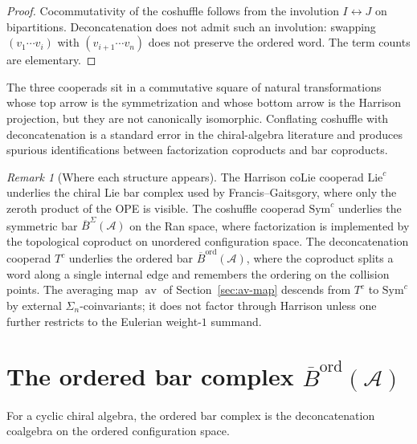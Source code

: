 \documentclass[11pt,reqno]{amsart}
\theoremstyle{definition}
\theoremstyle{remark}
\newtheorem{remark}[theorem]{Remark}
\newcommand{\cA}{\mathcal{A}}
\newcommand{\Sym}{\mathrm{Sym}}
\newcommand{\Lie}{\mathrm{Lie}}
\newcommand{\Barord}{\overline{B}^{\mathrm{ord}}}
\newcommand{\BarSig}{\overline{B}^{\Sigma}}
\newcommand{\av}{\operatorname{av}}
\numberwithin{equation}{section}
\begin{document}
\begin{proof}
Cocommutativity of the coshuffle follows from the involution
$I \leftrightarrow J$ on bipartitions. Deconcatenation does not
admit such an involution: swapping $(v_{1}\cdots v_{i})$ with
$(v_{i+1}\cdots v_{n})$ does not preserve the ordered word. The
term counts are elementary.
\end{proof}

The three cooperads sit in a commutative square of natural
transformations whose top arrow is the symmetrization and whose
bottom arrow is the Harrison projection, but they are not
canonically isomorphic. Conflating coshuffle with deconcatenation
is a standard error in the chiral-algebra literature and produces
spurious identifications between factorization coproducts and
bar coproducts.

\begin{remark}[Where each structure appears]
\label{rem:where-three-appear}
The Harrison coLie cooperad $\Lie^{c}$ underlies the chiral Lie
bar complex used by Francis--Gaitsgory, where only the zeroth
product of the OPE is visible. The coshuffle cooperad $\Sym^{c}$
underlies the symmetric bar $\BarSig(\cA)$ on the Ran space,
where factorization is implemented by the topological
coproduct on unordered configuration space. The deconcatenation
cooperad $T^{c}$ underlies the ordered bar $\Barord(\cA)$, where
the coproduct splits a word along a single internal edge and
remembers the ordering on the collision points. The averaging
map $\av$ of Section~\ref{sec:av-map} descends from $T^{c}$ to
$\Sym^{c}$ by external $\Sigma_{n}$-coinvariants; it does not
factor through Harrison unless one further restricts to the
Eulerian weight-$1$ summand.
\end{remark}

\section{The ordered bar complex \texorpdfstring{$\Barord(\cA)$}{Bord(A)}}
\label{sec:ordered-bar}

For a cyclic chiral algebra, the ordered bar complex is the
deconcatenation coalgebra on the ordered configuration space.
\end{document}
